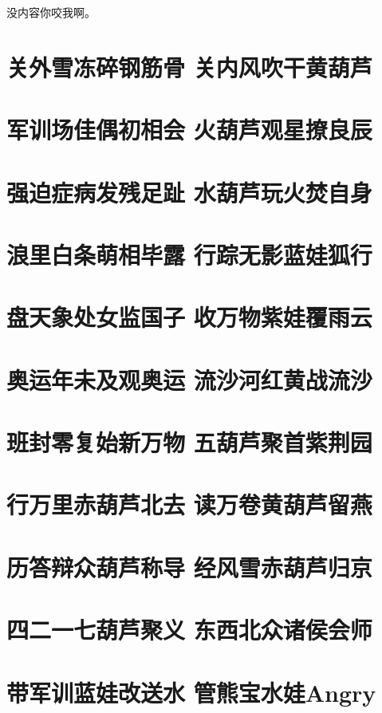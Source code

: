 \documentclass[12pt, a4paper]{book}
\begin{document}
\begin{CJK}{UTF8}{gbsn}
    没内容你咬我啊。

    \chapter{关外雪冻碎钢筋骨 关内风吹干黄葫芦}

    \chapter{军训场佳偶初相会 火葫芦观星撩良辰}

    \chapter{强迫症病发残足趾 水葫芦玩火焚自身}

    \chapter{浪里白条萌相毕露 行踪无影蓝娃狐行}

    \chapter{盘天象处女监国子 收万物紫娃覆雨云}

    \chapter{奥运年未及观奥运 流沙河红黄战流沙}

    \chapter{班封零复始新万物 五葫芦聚首紫荆园}

    \chapter{行万里赤葫芦北去 读万卷黄葫芦留燕}

    \chapter{历答辩众葫芦称导 经风雪赤葫芦归京}

    \chapter{四二一七葫芦聚义 东西北众诸侯会师}

    \chapter{带军训蓝娃改送水 管熊宝水娃Angry}


\end{CJK}
\end{document}
